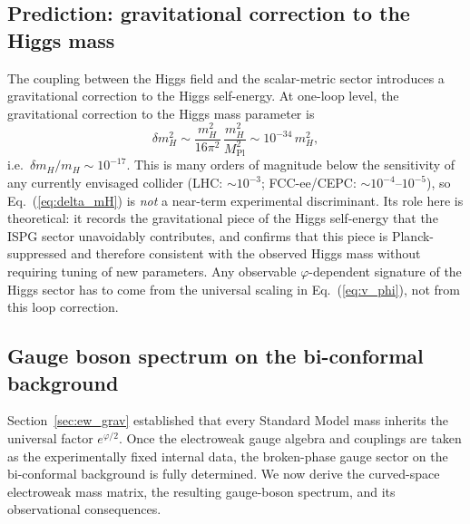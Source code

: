 \documentclass[aps,prd,onecolumn,superscriptaddress,nofootinbib,showpacs,12pt,notitlepage]{revtex4-2}
\newcommand{\Mpl}{M_{\mathrm{Pl}}}
\begin{document}
\subsection{Prediction: gravitational correction to the Higgs mass}
\label{sec:higgs_prediction}

The coupling between the Higgs field and the scalar-metric
sector introduces a gravitational correction to the Higgs
self-energy.  At one-loop level, the gravitational correction
to the Higgs mass parameter is
\begin{equation}\label{eq:delta_mH}
  \delta m_H^{2}
  \sim \frac{m_H^{2}}{16\pi^{2}}\,
    \frac{m_H^{2}}{\Mpl^{2}}
  \sim 10^{-34}\,m_H^{2},
\end{equation}
i.e.\ $\delta m_H/m_H \sim 10^{-17}$.  This is many
orders of magnitude below the sensitivity of any currently
envisaged collider (LHC: $\sim 10^{-3}$; FCC-ee/CEPC:
$\sim 10^{-4}$--$10^{-5}$), so Eq.~(\ref{eq:delta_mH})
is \emph{not} a near-term experimental discriminant.
Its role here is theoretical: it records the
gravitational piece of the Higgs self-energy that the
ISPG sector unavoidably contributes, and confirms that
this piece is Planck-suppressed and therefore consistent
with the observed Higgs mass without requiring tuning
of new parameters.  Any observable $\varphi$-dependent
signature of the Higgs sector has to come from the
universal scaling in Eq.~(\ref{eq:v_phi}), not from this
loop correction.

\subsection{Gauge boson spectrum on the bi-conformal background}
\label{sec:gauge_spectrum}

Section~\ref{sec:ew_grav} established that every Standard
Model mass inherits the universal factor $e^{\varphi/2}$.
Once the electroweak gauge algebra and couplings are taken as
the experimentally fixed internal data, the broken-phase gauge
sector on the bi-conformal background is fully determined.
We now derive the curved-space electroweak mass matrix, the
resulting gauge-boson spectrum, and its observational
consequences.
\end{document}

